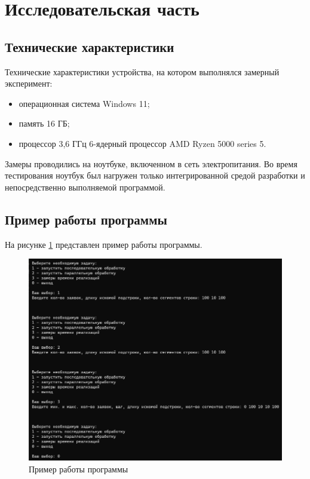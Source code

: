 \section{Исследовательская часть}

\subsection{Технические характеристики}

Технические характеристики устройства, на котором выполнялся замерный эксперимент:
\begin{itemize}[label*=---]
	\item операционная система Windows 11;
	\item память 16 ГБ;
	\item процессор 3,6 ГГц 6-ядерный процессор AMD Ryzen 5000 series 5.
\end{itemize}

Замеры проводились на ноутбуке, включенном в сеть электропитания. 
Во время тестирования ноутбук был нагружен только интегрированной средой разработки и непосредственно выполняемой программой.

\subsection{Пример работы программы}

На рисунке \ref{fig:example} представлен пример работы программы. 

\begin{figure}
	\centering
	\includegraphics[width=1\linewidth]{images/example}
	\caption{Пример работы программы}
	\label{fig:example}
\end{figure}

